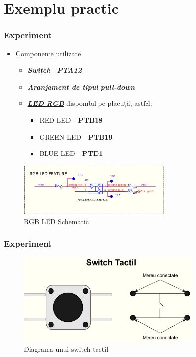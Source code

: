 \documentclass[xcolor={table}]{beamer}
\begin{document}
	\section{Exemplu practic}
	\begin{frame}
	    \frametitle{Experiment}
	    \begin{itemize}
	        \item Componente utilizate
	        \begin{itemize}
	            \item \textbf{\textit{Switch}} - \textbf{\textit{PTA12}}
	            \item \textbf{\textit{Aranjament de tipul pull-down}}
	            \item \textbf{\textit{	    \href{https://github.com/undacmic/MCULabs/blob/main/Resurse/FRDM-KL25Z_Schematics.pdf}{LED RGB}}} disponibil pe plăcuță, astfel:
	            \begin{itemize}
	                \item \color{red} RED LED - \textbf{PTB18}
	                \item \color{green} GREEN LED - \textbf{PTB19}
	                \item \color{blue} BLUE LED - \textbf{PTD1}
	            \end{itemize}
	        \end{itemize}
	    \end{itemize}
	    \begin{figure}
	        \centering
	        \includegraphics[width=7.5cm]{images/rgb-led.png}
	        \caption{RGB LED Schematic}
	        \label{fig:my_label}
	    \end{figure}
	\end{frame}
	\begin{frame}
	    \frametitle{Experiment}
	    \begin{figure}
	        \centering
	        \includegraphics[width=9cm]{images/switch-diagrama.png}
	        \caption{Diagrama unui switch tactil}
	        \label{fig:my_label}
	    \end{figure}
	\end{frame}
\end{document}
